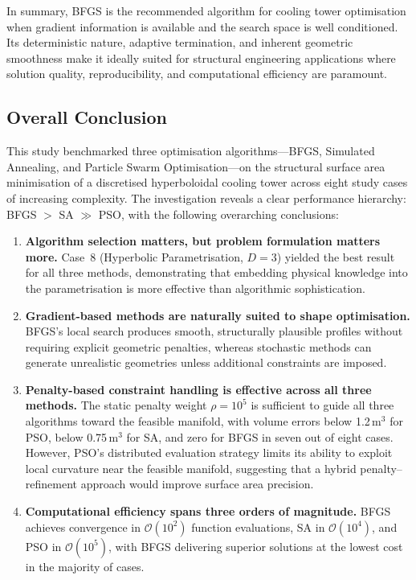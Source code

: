 In summary, BFGS is the recommended algorithm for cooling tower optimisation when gradient information is available and the search space is well conditioned. Its deterministic nature, adaptive termination, and inherent geometric smoothness make it ideally suited for structural engineering applications where solution quality, reproducibility, and computational efficiency are paramount.

\subsection{Overall Conclusion}

This study benchmarked three optimisation algorithms---BFGS, Simulated Annealing, and Particle Swarm Optimisation---on the structural surface area minimisation of a discretised hyperboloidal cooling tower across eight study cases of increasing complexity. The investigation reveals a clear performance hierarchy: BFGS $>$ SA $\gg$ PSO, with the following overarching conclusions:

\begin{enumerate}
    \item \textbf{Algorithm selection matters, but problem formulation matters more.} Case~8 (Hyperbolic Parametrisation, $D = 3$) yielded the best result for all three methods, demonstrating that embedding physical knowledge into the parametrisation is more effective than algorithmic sophistication.
    
    \item \textbf{Gradient-based methods are naturally suited to shape optimisation.} BFGS's local search produces smooth, structurally plausible profiles without requiring explicit geometric penalties, whereas stochastic methods can generate unrealistic geometries unless additional constraints are imposed.
    
    \item \textbf{Penalty-based constraint handling is effective across all three methods.} The static penalty weight $\rho = 10^5$ is sufficient to guide all three algorithms toward the feasible manifold, with volume errors below 1.2\,m$^3$ for PSO, below 0.75\,m$^3$ for SA, and zero for BFGS in seven out of eight cases. However, PSO's distributed evaluation strategy limits its ability to exploit local curvature near the feasible manifold, suggesting that a hybrid penalty--refinement approach would improve surface area precision.
    
    \item \textbf{Computational efficiency spans three orders of magnitude.} BFGS achieves convergence in $\mathcal{O}(10^2)$ function evaluations, SA in $\mathcal{O}(10^4)$, and PSO in $\mathcal{O}(10^5)$, with BFGS delivering superior solutions at the lowest cost in the majority of cases.
\end{enumerate}

